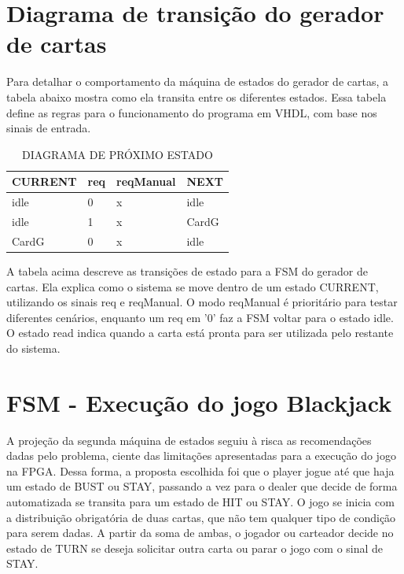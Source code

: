 \documentclass[oneside]{uffstex}
\begin{document}
\section{Diagrama de transição do gerador de cartas}
Para detalhar o comportamento da máquina de estados do gerador de cartas, a tabela abaixo mostra como ela transita entre os diferentes estados. Essa tabela define as regras para o funcionamento do programa em VHDL, com base nos sinais de entrada.
\begin{table}[H]
    \centering
    \caption{DIAGRAMA DE PRÓXIMO ESTADO}
    \begin{tabular}{|p{2cm}|p{1cm}|p{2cm}|p{1.25cm}|}
        \hline
        CURRENT & req & reqManual & NEXT \\ 
        \hline
        idle & 0 & x & idle  \\
        \hline
        idle & 1 & x & CardG  \\
        \hline
        CardG & 0 & x & idle  \\
        \hline
    \end{tabular}
    \label{tab:geradorcarta}
\end{table}
A tabela acima descreve as transições de estado para a FSM do gerador de cartas. Ela explica como o sistema se move dentro de um estado CURRENT, utilizando os sinais req e reqManual. O modo reqManual é prioritário para testar diferentes cenários, enquanto um req em '0' faz a FSM voltar para o estado idle. O estado read indica quando a carta está pronta para ser utilizada pelo restante do sistema.

\section{FSM - Execução do jogo Blackjack}

A projeção da segunda máquina de estados seguiu à risca as recomendações dadas pelo problema, ciente das limitações apresentadas para a execução do jogo na FPGA. Dessa forma, a proposta escolhida foi que o player jogue até que haja um estado de BUST ou STAY, passando a vez para o dealer que decide de forma automatizada se transita para um estado de HIT ou STAY. O jogo se inicia com a distribuição obrigatória de duas cartas, que não tem qualquer tipo de condição para serem dadas. A partir da soma de ambas, o jogador ou carteador decide no estado de TURN se deseja solicitar outra carta ou parar o jogo com o sinal de STAY.
\end{document}
